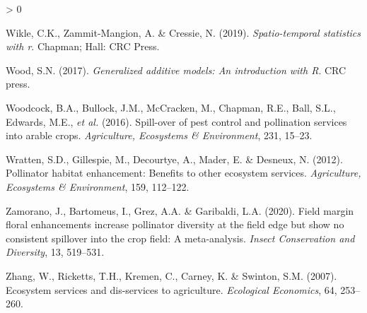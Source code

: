 \documentclass[]{elsarticle} %
\newlength{\cslhangindent}
\newenvironment{CSLReferences}[2] %
 {%
  \setlength{\parindent}{0pt}
  \ifodd #1 \everypar{\setlength{\hangindent}{\cslhangindent}}\ignorespaces\fi
  \ifnum #2 > 0
  \setlength{\parskip}{#2\baselineskip}
  \fi
 }%
 {}
\begin{document}
\begin{CSLReferences}{1}{0}
\leavevmode\hypertarget{ref-wickle2019}{}%
Wikle, C.K., Zammit-Mangion, A. \& Cressie, N. (2019). \emph{Spatio-temporal statistics with r}. Chapman; Hall: CRC Press.

\leavevmode\hypertarget{ref-wood2017}{}%
Wood, S.N. (2017). \emph{Generalized additive models: An introduction with {R}}. CRC press.

\leavevmode\hypertarget{ref-woodcock2016}{}%
Woodcock, B.A., Bullock, J.M., McCracken, M., Chapman, R.E., Ball, S.L., Edwards, M.E., \emph{et al.} (2016). Spill-over of pest control and pollination services into arable crops. \emph{Agriculture, Ecosystems \& Environment}, 231, 15--23.

\leavevmode\hypertarget{ref-wratten2012}{}%
Wratten, S.D., Gillespie, M., Decourtye, A., Mader, E. \& Desneux, N. (2012). Pollinator habitat enhancement: Benefits to other ecosystem services. \emph{Agriculture, Ecosystems {\&} Environment}, 159, 112--122.

\leavevmode\hypertarget{ref-zamorano2020}{}%
Zamorano, J., Bartomeus, I., Grez, A.A. \& Garibaldi, L.A. (2020). Field margin floral enhancements increase pollinator diversity at the field edge but show no consistent spillover into the crop field: A meta-analysis. \emph{Insect Conservation and Diversity}, 13, 519--531.

\leavevmode\hypertarget{ref-zhang2007}{}%
Zhang, W., Ricketts, T.H., Kremen, C., Carney, K. \& Swinton, S.M. (2007). Ecosystem services and dis-services to agriculture. \emph{Ecological Economics}, 64, 253--260.

\end{CSLReferences}
\end{document}
